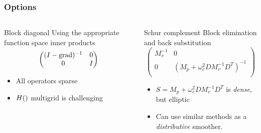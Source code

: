 \documentclass[presentation]{beamer}
\DeclareMathOperator{\grad}{grad}
\let\div\relax
\DeclareMathOperator{\div}{div}
\begin{document}
\begin{frame}[t]
  \frametitle{Options}
  \begin{columns}
    \begin{column}{0.52\textwidth}
      \begin{block}{Block diagonal}
        Using the appropriate function space inner products \parencite{Mardal:2011,Kirby:2010}
        \begin{equation*}
          \begin{pmatrix}
            (I - \grad \div)^{-1} & 0 \\
            0 & I\\
          \end{pmatrix}
        \end{equation*}
      \end{block}
      \begin{itemize}
      \item All operators sparse
      \item $H(\div)$ multigrid \parencite{Arnold:2000} is challenging
      \end{itemize}
    \end{column}
    \begin{column}{0.52\textwidth}
      \begin{block}{Schur complement}
        Block elimination and back substitution
        \begin{equation*}
          \begin{pmatrix}
            M_v^{-1} & 0 \\
            0 & (M_p + \omega_c^2 D M_v^{-1} D^T)^{-1}\\
          \end{pmatrix}
        \end{equation*}
      \end{block}
      \begin{itemize}
      \item $S = M_p +  \omega_c^2 D M_v^{-1} D^T$ is \emph{dense}, but elliptic
      \item Can use similar methods as a \emph{distributive} smoother.
      \end{itemize}
    \end{column}
  \end{columns}
\end{frame}
\end{document}

